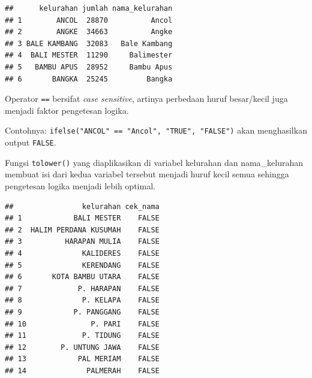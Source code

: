 \documentclass[openany]{book}
\newenvironment{Shaded}{\begin{snugshade}}{\end{snugshade}}
\newcommand{\KeywordTok}[1]{\textcolor[rgb]{0.13,0.29,0.53}{\textbf{#1}}}
\newcommand{\DataTypeTok}[1]{\textcolor[rgb]{0.13,0.29,0.53}{#1}}
\newcommand{\StringTok}[1]{\textcolor[rgb]{0.31,0.60,0.02}{#1}}
\newcommand{\CommentTok}[1]{\textcolor[rgb]{0.56,0.35,0.01}{\textit{#1}}}
\newcommand{\OperatorTok}[1]{\textcolor[rgb]{0.81,0.36,0.00}{\textbf{#1}}}
\newcommand{\NormalTok}[1]{#1}
\begin{document}
\begin{verbatim}
##      kelurahan jumlah nama_kelurahan
## 1        ANCOL  28870          Ancol
## 2        ANGKE  34663          Angke
## 3 BALE KAMBANG  32083   Bale Kambang
## 4  BALI MESTER  11290     Balimester
## 5   BAMBU APUS  28952     Bambu Apus
## 6       BANGKA  25245         Bangka
\end{verbatim}

\begin{Shaded}
\end{Shaded}

Operator \texttt{==} bersifat \emph{case sensitive}, artinya perbedaan
huruf besar/kecil juga menjadi faktor pengetesan logika.

Contohnya: \texttt{ifelse("ANCOL"\ ==\ "Ancol",\ "TRUE",\ "FALSE")} akan
menghasilkan output \texttt{FALSE}.

Fungsi \texttt{tolower()} yang diaplikasikan di variabel kelurahan dan
nama\_kelurahan membuat isi dari kedua variabel tersebut menjadi huruf
kecil semua sehingga pengetesan logika menjadi lebih optimal.

\begin{Shaded}
\end{Shaded}

\begin{verbatim}
##                kelurahan cek_nama
## 1            BALI MESTER    FALSE
## 2  HALIM PERDANA KUSUMAH    FALSE
## 3          HARAPAN MULIA    FALSE
## 4              KALIDERES    FALSE
## 5              KERENDANG    FALSE
## 6       KOTA BAMBU UTARA    FALSE
## 7             P. HARAPAN    FALSE
## 8              P. KELAPA    FALSE
## 9            P. PANGGANG    FALSE
## 10               P. PARI    FALSE
## 11             P. TIDUNG    FALSE
## 12        P. UNTUNG JAWA    FALSE
## 13            PAL MERIAM    FALSE
## 14              PALMERAH    FALSE
\end{verbatim}
\end{document}
